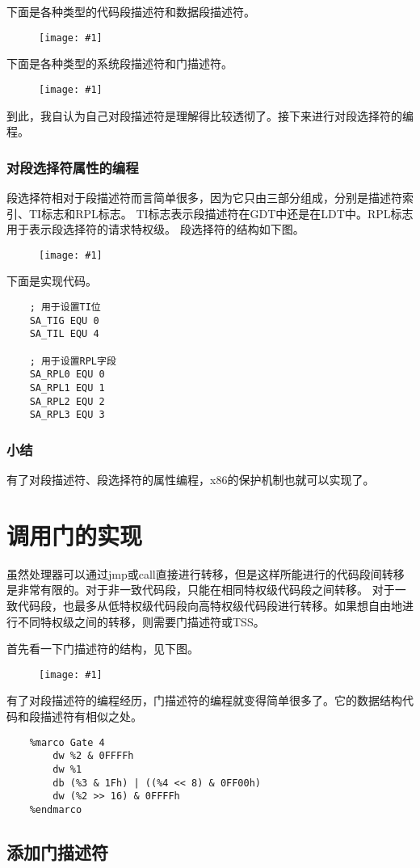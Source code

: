 \documentclass[a4paper,left=2.5cm,right=2.5cm,11pt]{article}
\newcommand{\fic}[1]{\begin{figure}[H]
		\center
		\texttt{[image: \#1]}
	\end{figure}}
\begin{document}
	下面是各种类型的代码段描述符和数据段描述符。
	\fic{3.png}

	\clearpage

	下面是各种类型的系统段描述符和门描述符。
	\fic{4.png}

	到此，我自认为自己对段描述符是理解得比较透彻了。接下来进行对段选择符的编程。

\subsubsection{对段选择符属性的编程}
	段选择符相对于段描述符而言简单很多，因为它只由三部分组成，分别是描述符索引、TI标志和RPL标志。
	TI标志表示段描述符在GDT中还是在LDT中。RPL标志用于表示段选择符的请求特权级。
	段选择符的结构如下图。
	\fic{5.png}

	下面是实现代码。
	\begin{lstlisting}
	; 用于设置TI位
	SA_TIG EQU 0
	SA_TIL EQU 4

	; 用于设置RPL字段
	SA_RPL0 EQU 0
	SA_RPL1 EQU 1
	SA_RPL2 EQU 2
	SA_RPL3 EQU 3
	\end{lstlisting}

\subsubsection{小结}
	有了对段描述符、段选择符的属性编程，x86的保护机制也就可以实现了。

\clearpage

\section{调用门的实现}
	虽然处理器可以通过jmp或call直接进行转移，但是这样所能进行的代码段间转移是非常有限的。对于非一致代码段，只能在相同特权级代码段之间转移。
	对于一致代码段，也最多从低特权级代码段向高特权级代码段进行转移。如果想自由地进行不同特权级之间的转移，则需要门描述符或TSS。\par
	首先看一下门描述符的结构，见下图。
	\fic{6.png}

	有了对段描述符的编程经历，门描述符的编程就变得简单很多了。它的数据结构代码和段描述符有相似之处。
	\begin{lstlisting}
	%marco Gate 4
		dw %2 & 0FFFFh
		dw %1
		db (%3 & 1Fh) | ((%4 << 8) & 0FF00h)
		dw (%2 >> 16) & 0FFFFh
	%endmarco
	\end{lstlisting}

\subsection{添加门描述符}
\end{document}
